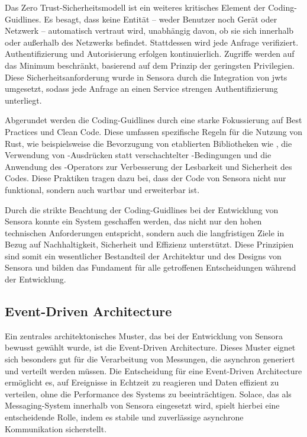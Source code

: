 Das Zero Trust-Sicherheitsmodell ist ein weiteres kritisches Element der Cod\-ing-Guid\-lines. Es besagt, dass keine Entität – weder Benutzer noch Gerät oder Netzwerk – automatisch vertraut wird, unabhängig davon, ob sie sich innerhalb oder außerhalb des Netzwerks befindet. Stattdessen wird jede Anfrage verifiziert. Authentifizierung und Autorisierung erfolgen kontinuierlich. Zugriffe werden auf das Minimum beschränkt, basierend auf dem Prinzip der geringsten Privilegien. Diese Sicherheitsanforderung wurde in Sensora durch die Integration von \acp{jwt} umgesetzt, sodass jede Anfrage an einen Service strengen Authentifizierung unterliegt.

Abgerundet werden die Coding-Guidlines durch eine starke Fokussierung auf Best Practices und Clean Code. Diese umfassen spezifische Regeln für die Nutzung von Rust, wie beispielsweise die Bevorzugung von etablierten Bibliotheken wie , die Verwendung von -Ausdrücken statt verschachtelter -Bedingungen und die Anwendung des -Operators zur Verbesserung der Lesbarkeit und Sicherheit des Codes. Diese Praktiken tragen dazu bei, dass der Code von Sensora nicht nur funktional, sondern auch wartbar und erweiterbar ist.

Durch die strikte Beachtung der Coding-Guidlines bei der Entwicklung von Sensora konnte ein System geschaffen werden, das nicht nur den hohen technischen Anforderungen entspricht, sondern auch die langfristigen Ziele in Bezug auf Nachhaltigkeit, Sicherheit und Effizienz unterstützt. Diese Prinzipien sind somit ein wesentlicher Bestandteil der Architektur und des Designs von Sensora und bilden das Fundament für alle getroffenen Entscheidungen während der Entwicklung.

\subsection{Event-Driven Architecture}
Ein zentrales architektonisches Muster, das bei der Entwicklung von Sensora bewusst gewählt wurde, ist die Event-Driven Architecture. Dieses Muster eignet sich besonders gut für die Verarbeitung von Messungen, die asynchron generiert und verteilt werden müssen. Die Entscheidung für eine Event-Driven Architecture ermöglicht es, auf Ereignisse in Echtzeit zu reagieren und Daten effizient zu verteilen, ohne die Performance des Systems zu beeinträchtigen. Solace, das als Messaging-System innerhalb von Sensora eingesetzt wird, spielt hierbei eine entscheidende Rolle, indem es stabile und zuverlässige asynchrone Kommunikation sicherstellt.

